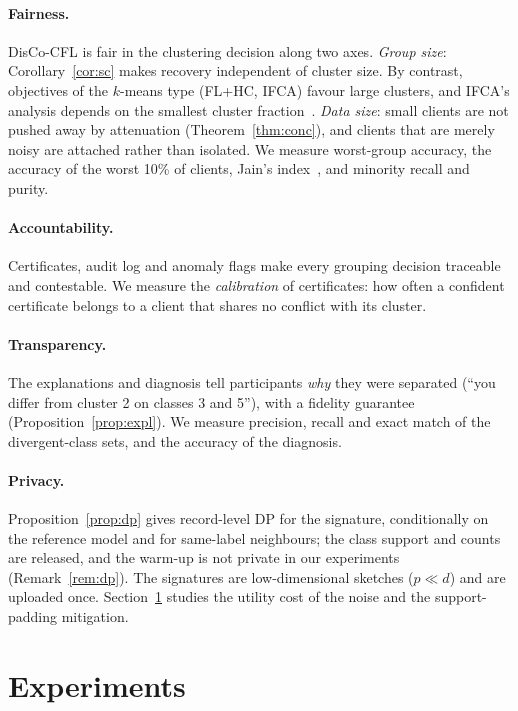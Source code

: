 \documentclass[pdflatex,sn-apa]{sn-jnl}
\theoremstyle{thmstyleone}
\theoremstyle{thmstylethree}
\begin{document}
\paragraph{Fairness.} DisCo-CFL is fair in the clustering decision along two axes. \emph{Group size}: Corollary~\ref{cor:sc} makes recovery independent of cluster size. By contrast, objectives of the $k$-means type (FL+HC, IFCA) favour large clusters, and IFCA's analysis depends on the smallest cluster fraction~\citep{ghosh2020ifca}. \emph{Data size}: small clients are not pushed away by attenuation (Theorem~\ref{thm:conc}), and clients that are merely noisy are attached rather than isolated. We measure worst-group accuracy, the accuracy of the worst 10\% of clients, Jain's index~\citep{jain1984fairness}, and minority recall and purity.
\paragraph{Accountability.} Certificates, audit log and anomaly flags make every grouping decision traceable and contestable. We measure the \emph{calibration} of certificates: how often a confident certificate belongs to a client that shares no conflict with its cluster.
\paragraph{Transparency.} The explanations and diagnosis tell participants \emph{why} they were separated (``you differ from cluster 2 on classes 3 and 5''), with a fidelity guarantee (Proposition~\ref{prop:expl}). We measure precision, recall and exact match of the divergent-class sets, and the accuracy of the diagnosis.
\paragraph{Privacy.} Proposition~\ref{prop:dp} gives record-level DP for the signature, conditionally on the reference model and for same-label neighbours; the class support and counts are released, and the warm-up is not private in our experiments (Remark~\ref{rem:dp}). The signatures are low-dimensional sketches ($p\ll d$) and are uploaded once. Section~\ref{sec:exp} studies the utility cost of the noise and the support-padding mitigation.

\section{Experiments}\label{sec:exp}

\end{document}
